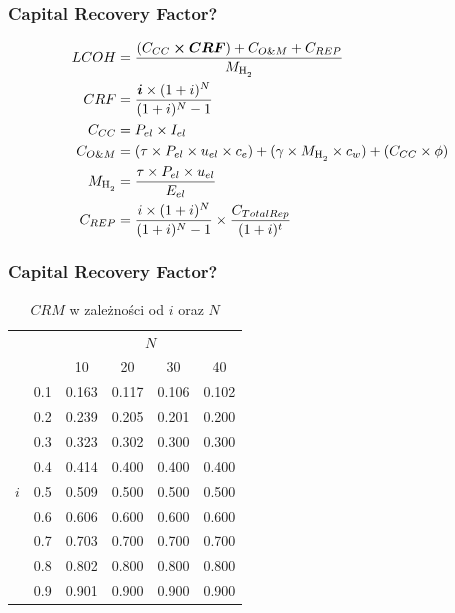 \documentclass{beamer}
\newcommand{\HH}{\ce{H2}\xspace}
\begin{document}
\begin{frame}
	\frametitle{Capital Recovery Factor?}
	\begin{align}
		LCOH     & = \frac{(C_{CC} \boldsymbol{\times CRF})
		+ C_{O\&M} + C_{REP}}{M_{\HH}} \nonumber                                      \\
		CRF      & =  \frac{\boldsymbol{i} \times (1 + i)^N}{(1 + i)^N - 1} \nonumber \\
		C_{CC}   & =  P_{el} \times I_{el} \nonumber                                  \\
		C_{O\&M} & =  (\tau \times P_{el} \times u_{el} \times c_e)
		+ (\gamma \times M_{\HH} \times c_w)
		+ (C_{CC} \times \phi) \nonumber                                              \\
		M_{\HH}  & =  \frac{\tau \times P_{el}
		\times u_{el}}{E_{el}} \nonumber                                              \\
		C_{REP}  & =  \frac{i \times (1 + i)^N}{(1 + i)^N - 1}
		\times \frac{C_{TotalRep}}{(1+i)^t} \nonumber
	\end{align}
\end{frame}

\begin{frame}
	\frametitle{Capital Recovery Factor?}

	\begin{table}
		\begin{tabular}{|| c | c || c c c c ||}
			\hline
			\multicolumn{2}{||c||}{} & \multicolumn{4}{c||}{$N$}                                 \\
			\cline{3-6}
			\multicolumn{2}{||c||}{} & 10                        & 20    & 30    & 40            \\ [0.5ex]
			\hline\hline
			\multirow{9}{*}{$i$}     & 0.1                       & 0.163 & 0.117 & 0.106 & 0.102 \\
			\cline{2-6}
			                         & 0.2                       & 0.239 & 0.205 & 0.201 & 0.200 \\
			\cline{2-6}
			                         & 0.3                       & 0.323 & 0.302 & 0.300 & 0.300 \\
			\cline{2-6}
			                         & 0.4                       & 0.414 & 0.400 & 0.400 & 0.400 \\
			\cline{2-6}
			                         & 0.5                       & 0.509 & 0.500 & 0.500 & 0.500 \\
			\cline{2-6}
			                         & 0.6                       & 0.606 & 0.600 & 0.600 & 0.600 \\
			\cline{2-6}
			                         & 0.7                       & 0.703 & 0.700 & 0.700 & 0.700 \\
			\cline{2-6}
			                         & 0.8                       & 0.802 & 0.800 & 0.800 & 0.800 \\
			\cline{2-6}
			                         & 0.9                       & 0.901 & 0.900 & 0.900 & 0.900 \\ [1ex]
			\hline
		\end{tabular}
		\centering
		\caption{$CRM$ w zależności od $i$ oraz $N$}
	\end{table}
\end{frame}
\end{document}
